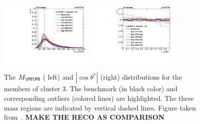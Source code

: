 \begin{figure}[h]\begin{center}
\includegraphics[width=0.41\textwidth, angle =0 ]{figures/envelope/5par_13Tev_Nclu12_Clus3_mhh.pdf}
\includegraphics[width=0.41\textwidth, angle =0 ]{figures/envelope/5par_13Tev_Nclu12_Clus3_hcths.pdf}
\caption{\small  The $\mHH$ ( left) and $|\cos \theta^{*}|$ (right) distributions for the members of cluster 3. The benchmark (in black color) and corresponding outliers (colored lines) are highlighted. The three mass regions are indicated by vertical dashed lines. Figure taken from~\cite{CarvalhoAntunesDeOliveira:2130724}. 
{\bf MAKE THE RECO AS COMPARISON}
\label{fig:out_mass}}
\end{center}\end{figure}





